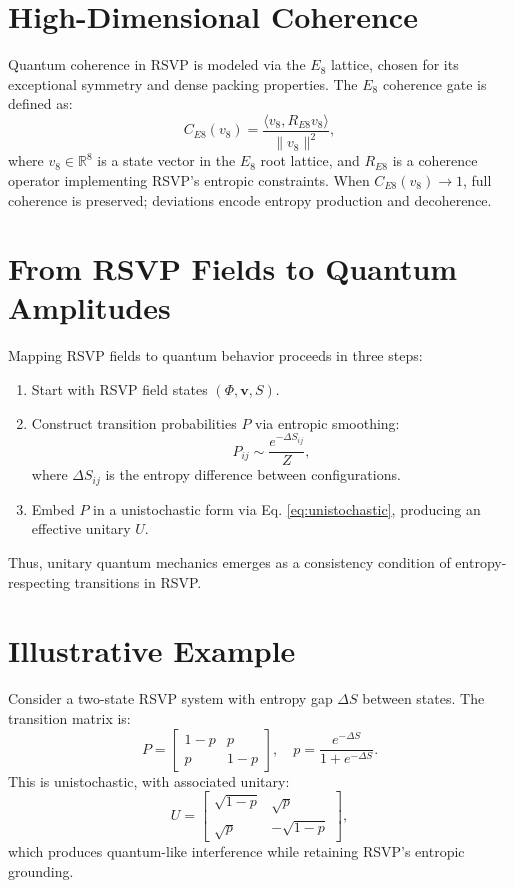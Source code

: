 \documentclass[12pt]{report}
\begin{document}
\section{High-Dimensional Coherence}
Quantum coherence in RSVP is modeled via the \(E_8\) lattice, chosen for its exceptional symmetry and dense packing properties. The \(E_8\) coherence gate is defined as:
\begin{equation}
C_{E8}(v_8) = \frac{\langle v_8, R_{E8} v_8 \rangle}{\|v_8\|^2}, \label{eq:e8}
\end{equation}
where \(v_8 \in \mathbb{R}^8\) is a state vector in the \(E_8\) root lattice, and \(R_{E8}\) is a coherence operator implementing RSVP’s entropic constraints. When \(C_{E8}(v_8) \to 1\), full coherence is preserved; deviations encode entropy production and decoherence.

\section{From RSVP Fields to Quantum Amplitudes}
Mapping RSVP fields to quantum behavior proceeds in three steps:
\begin{enumerate}
    \item Start with RSVP field states \((\Phi, \mathbf{v}, S)\).
    \item Construct transition probabilities \(P\) via entropic smoothing:
    \[
    P_{ij} \sim \frac{e^{-\Delta S_{ij}}}{Z},
    \]
    where \(\Delta S_{ij}\) is the entropy difference between configurations.
    \item Embed \(P\) in a unistochastic form via Eq. \eqref{eq:unistochastic}, producing an effective unitary \(U\).
\end{enumerate}
Thus, unitary quantum mechanics emerges as a consistency condition of entropy-respecting transitions in RSVP.

\section{Illustrative Example}
Consider a two-state RSVP system with entropy gap \(\Delta S\) between states. The transition matrix is:
\begin{equation}
P = \begin{bmatrix}
1-p & p \\
p & 1-p
\end{bmatrix}, \quad p = \frac{e^{-\Delta S}}{1+e^{-\Delta S}}.
\end{equation}
This is unistochastic, with associated unitary:
\begin{equation}
U = \begin{bmatrix}
\sqrt{1-p} & \sqrt{p} \\
\sqrt{p} & -\sqrt{1-p}
\end{bmatrix},
\end{equation}
which produces quantum-like interference while retaining RSVP’s entropic grounding.
\end{document}
